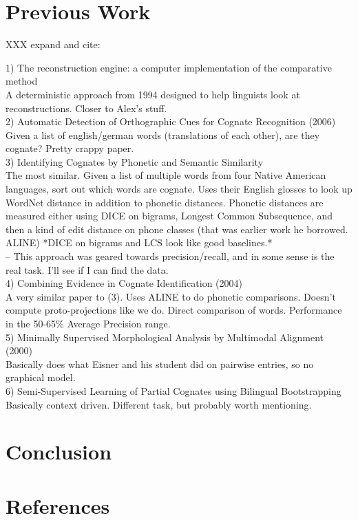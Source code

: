 \documentclass[11pt,a4paper]{article}
\begin{document}
\section{Previous Work}
XXX expand and cite:

1) The reconstruction engine: a computer implementation of the
comparative method\\
  A deterministic approach from 1994 designed to help linguists look
at reconstructions. Closer to Alex's stuff. \\
2) Automatic Detection of Orthographic Cues for Cognate Recognition (2006) \\
  Given a list of english/german words (translations of each other),
are they cognate? Pretty crappy paper.\\
3) Identifying Cognates by Phonetic and Semantic Similarity \\
  The most similar. Given a list of multiple words from four Native
American languages, sort out which words are cognate. Uses their
English glosses to look up WordNet distance in addition to phonetic
distances. Phonetic distances are measured either using DICE on
bigrams, Longest Common Subsequence, and then a kind of edit distance
on phone classes (that was earlier work he borrowed. ALINE) *DICE on
bigrams and LCS look like good baselines.*\\
  -- This approach was geared towards precision/recall, and in some
sense is the real task. I'll see if I can find the data. \\
4)  Combining Evidence in Cognate Identification (2004) \\
  A very similar paper to (3). Uses ALINE to do phonetic comparisons.
Doesn't compute proto-projections like we do. Direct comparison of
words. Performance in the 50-65\% Average Precision range.\\
5) Minimally Supervised Morphological Analysis by Multimodal Alignment (2000) \\
  Basically does what Eisner and his student did on pairwise entries,
so no graphical model.\\
6) Semi-Supervised Learning of Partial Cognates using Bilingual Bootstrapping
  Basically context driven. Different task, but probably worth mentioning.

\section{Conclusion}
\section*{References}


\end{document}
